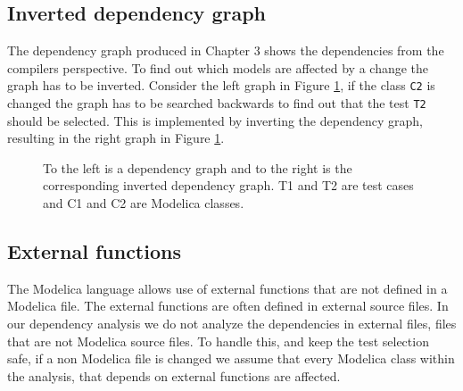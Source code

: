 \documentclass{cslthse-msc}
\begin{document}
\subsection{Inverted dependency graph}
The dependency graph produced in Chapter 3 shows the dependencies from the compilers perspective. To find out which models are affected by a change the graph has to be inverted. Consider the left graph in Figure \ref{fig:invertedGraph}, if the class \texttt{C2} is changed the graph has to be searched backwards to find out that the test \texttt{T2} should be selected. This is implemented by inverting the dependency graph, resulting in the right graph in Figure \ref{fig:invertedGraph}.

\begin{figure}[!htbp]
    \centering
    \qquad
    \caption{To the left is a dependency graph and to the right is the corresponding inverted dependency graph. T1 and T2 are test cases and C1 and C2 are Modelica classes.}
    \label{fig:invertedGraph}
\end{figure}

\subsection{External functions}
The Modelica language allows use of external functions that are not defined in a Modelica file. The external functions are often defined in external source files\cite{modelicamodelica}. In our dependency analysis we do not analyze the dependencies in external files, files that are not Modelica source files. To handle this, and keep the test selection safe, if a non Modelica file is changed we assume that every Modelica class within the analysis, that depends on external functions are affected.
\end{document}
